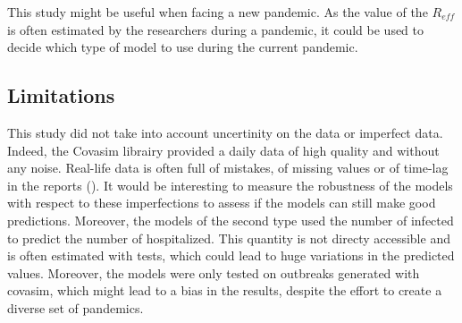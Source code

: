 This study might be useful when facing a new pandemic.
As the value of the $R_{eff}$ is often estimated by the researchers during a pandemic, it could be used to decide which type of model to use during the current pandemic. 


\subsection{Limitations}

This study did not take into account uncertinity on the data or imperfect data. 
Indeed, the Covasim librairy provided a daily data of high quality and without any noise. 
Real-life data is often full of mistakes, of missing values or of time-lag in the reports (\cite{greene_Nowcasting}).
It would be interesting to measure the robustness of the models with respect to these imperfections to assess if the models can still make good predictions. 
Moreover, the models of the second type used the number of infected to predict the number of hospitalized. 
This quantity is not directy accessible and is often estimated with tests, which could lead to huge variations in the predicted values.  
Moreover, the models were only tested on outbreaks generated with covasim, which might lead to a bias in the results, despite the effort to create a diverse set of pandemics. 

